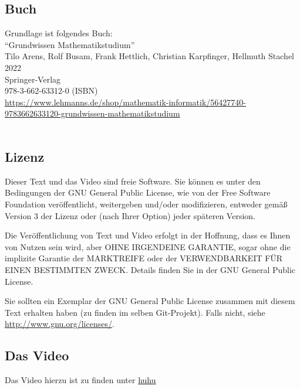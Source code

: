 \documentclass[a4paper]{amsart}
\theoremstyle{definition}
\begin{document}
\subsection*{Buch}
Grundlage ist folgendes Buch:\\
"`Grundwissen Mathematikstudium"'\\
Tilo Arens, Rolf Busam, Frank Hettlich, Christian Karpfinger, Hellmuth Stachel \\
2022\\
Springer-Verlag\\
978-3-662-63312-0 (ISBN)\\
{\tiny
   \url{https://www.lehmanns.de/shop/mathematik-informatik/56427740-9783662633120-grundwissen-mathematikstudium}}\\
\\

\subsection*{Lizenz}
Dieser Text und das Video sind freie Software. Sie können es unter den Bedingungen der 
GNU General Public License, wie von der Free Software Foundation veröffentlicht, weitergeben 
und/oder modifizieren, entweder gemäß Version 3 der Lizenz oder (nach Ihrer Option) jeder späteren Version.

Die Veröffentlichung von Text und Video erfolgt in der Hoffnung, dass es Ihnen von Nutzen sein wird, 
aber OHNE IRGENDEINE GARANTIE, sogar ohne die implizite Garantie der MARKTREIFE oder der 
VERWENDBARKEIT FÜR EINEN BESTIMMTEN ZWECK. Details finden Sie in der GNU General Public License.

Sie sollten ein Exemplar der GNU General Public License zusammen mit diesem Text erhalten haben 
(zu finden im selben Git-Projekt). 
Falls nicht, siehe \url{http://www.gnu.org/licenses/}.

\subsection*{Das Video}
Das Video hierzu ist zu finden unter 
{\tiny
   \url{huhu}
}
\end{document}
